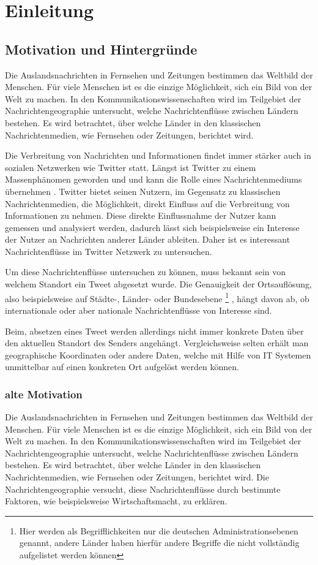 \chapter{Einleitung}

	\section{Motivation und Hintergründe}
		Die Auslandsnachrichten in Fernsehen und Zeitungen bestimmen das Weltbild der Menschen.
		Für viele Menschen ist es die einzige Möglichkeit, sich ein Bild von der Welt zu machen. 
		In den Kommunikationswissenschaften wird im Teilgebiet der Nachrichtengeographie untersucht, welche Nachrichtenflüsse zwischen Ländern bestehen.
		Es wird betrachtet, über welche Länder in den klassischen Nachrichtenmedien, wie Fernsehen oder Zeitungen, berichtet wird.

		Die Verbreitung von Nachrichten und Informationen findet immer stärker auch in sozialen Netzwerken wie Twitter statt. 
		Längst ist Twitter zu einem Massenphänomen geworden und und kann die Rolle eines Nachrichtenmediums übernehmen \cite{Petrovic2013}.
		Twitter bietet seinen Nutzern, im Gegensatz zu klassischen Nachrichtenmedien, die Möglichkeit, direkt Einfluss auf die Verbreitung von Informationen zu nehmen. 
		Diese direkte Einflussnahme der Nutzer kann gemessen und analysiert werden, dadurch lässt sich beispielsweise ein Interesse der Nutzer an Nachrichten anderer Länder ableiten.
		Daher ist es interessant Nachrichtenflüsse im Twitter Netzwerk zu untersuchen. 
	
		Um diese Nachrichtenflüsse untersuchen zu können, muss bekannt sein von welchem Standort ein Tweet abgesetzt wurde. 
		Die Genauigkeit der Ortsauflösung, also beispielsweise auf Städte-, Länder- oder Bundesebene \footnote{Hier werden als Begrifflichkeiten nur die deutschen Administrationsebenen genannt, andere Länder haben hierfür andere Begriffe die nicht vollständig aufgelistet werden können} , hängt davon ab, ob internationale oder aber nationale Nachrichtenflüsse von Interesse sind.
		
		Beim, absetzen eines Tweet werden allerdings nicht immer konkrete Daten über den aktuellen Standort des Senders angehängt.
		Vergleichsweise selten erhält man geographische Koordinaten oder andere Daten, welche mit Hilfe von IT Systemen unmittelbar auf einen konkreten Ort aufgelöst werden können.

	\subsection{alte Motivation} 
		Die Auslandsnachrichten in Fernsehen und Zeitungen bestimmen das Weltbild der Menschen.
		Für viele Menschen ist es die einzige Möglichkeit, sich ein Bild von der Welt zu machen. 
		In den Kommunikationswissenschaften wird im Teilgebiet der Nachrichtengeographie untersucht, welche Nachrichtenflüsse zwischen Ländern bestehen.
		Es wird betrachtet, über welche Länder in den klassischen Nachrichtenmedien, wie Fernsehen oder Zeitungen, berichtet wird. 
		Die Nachrichtengeographie versucht, diese Nachrichtenflüsse durch bestimmte Faktoren, wie beispielsweise Wirtschaftsmacht, zu erklären. 

